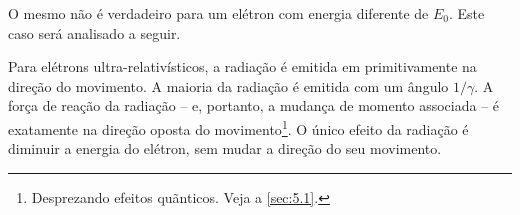 O mesmo não é verdadeiro para um elétron com energia diferente de $E_0$. Este caso será analisado a seguir.

Para elétrons ultra-relativísticos, a radiação é emitida em primitivamente na direção do movimento. A maioria da radiação é emitida com um ângulo $1/\gamma$. A força de reação da radiação -- e, portanto, a mudança de momento associada -- é exatamente na direção oposta do movimento\footnote{Desprezando efeitos quãnticos. Veja a \autoref{sec:5.1}.}. O único efeito da radiação é diminuir a energia do elétron, sem mudar a direção do seu movimento.